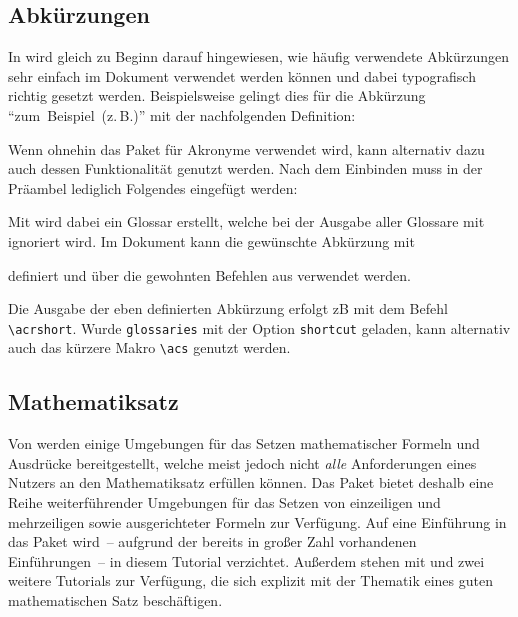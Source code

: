 \documentclass[%
  english,ngerman,%
  cdgeometry=no,DIV=12,automark,%
]{tudscrartcl}
\newcommand*\newabbreviation[4][]{%
    \newacronym[type=abbreviation,#1]{#2}{#3}{#4}%
  }%
\begin{document}
\subsection{Abkürzungen}
In \cite{struckmann2007} wird gleich zu Beginn darauf hingewiesen, wie häufig 
verwendete Abkürzungen sehr einfach im Dokument verwendet werden können und 
dabei typografisch richtig gesetzt werden. Beispielsweise gelingt dies für die 
Abkürzung \enquote{zum~Beispiel~(z.\,B.)} mit der nachfolgenden Definition:
%
\begin{Hint}
\newcommand{\zB}{\mbox{z.\,B.}\xspace}
\end{Hint}
%
Wenn ohnehin das Paket  für Akronyme verwendet wird, kann 
alternativ dazu auch dessen Funktionalität genutzt werden. Nach dem Einbinden 
muss in der Präambel lediglich Folgendes eingefügt werden:
%
\begin{Hint}
  \newcommand*\newabbreviation[4][]{%
    \newacronym[type=abbreviation,#1]{#2}{\mbox{#3\xspace}}{#4}%
  }%
\end{Hint}
%
Mit  wird dabei ein Glossar erstellt, welche bei der 
Ausgabe aller Glossare mit  ignoriert wird. Im Dokument 
kann die gewünschte Abkürzung mit 
%
\begin{Hint*}
\newabbreviation{zB}{z.\,B.}{zum Beispiel}
\end{Hint*}
%
definiert und über die gewohnten Befehlen aus  verwendet 
werden.
%
\begin{Hint*}
Die Ausgabe der eben definierten Abkürzung erfolgt \acrshort{zB} mit dem 
Befehl \texttt{\textbackslash acrshort}. Wurde \texttt{glossaries} mit 
der Option \texttt{shortcut} geladen, kann alternativ auch das kürzere 
Makro \texttt{\textbackslash acs} genutzt werden.
\end{Hint*}


\subsection{Mathematiksatz}
Von  werden einige Umgebungen für das Setzen mathematischer 
Formeln und Ausdrücke bereitgestellt, welche meist jedoch nicht \emph{alle} 
Anforderungen eines Nutzers an den Mathematiksatz erfüllen können. Das Paket
 bietet deshalb eine Reihe weiterführender Umgebungen für das 
Setzen von einzeiligen und mehrzeiligen sowie ausgerichteter Formeln zur 
Verfügung. Auf eine Einführung in das Paket wird~-- aufgrund der bereits in 
großer Zahl vorhandenen Einführungen~-- in diesem Tutorial verzichtet. Außerdem 
stehen mit  und  zwei weitere Tutorials 
zur Verfügung, die sich explizit mit der Thematik eines guten mathematischen 
Satz beschäftigen.
\end{document}
